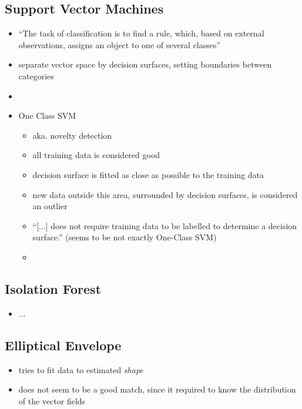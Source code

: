 	\subsection{Support Vector Machines}
	\begin{itemize}
		\item \enquote{The task of classification is to find a rule, which, based on external observations, assigns an object to one of several classes} \parencite{Muller2001}
		\item separate vector space by decision surfaces, setting boundaries between categories \parencite{Muller2001}
		\item 
		
		
		\item One Class SVM
			\begin{itemize}
				\item aka. novelty detection
				\item all training data is considered good
				\item decision surface is fitted as close as possible to the training data
				\item new data outside this area, surrounded by decision surfaces, is considered an outlier
				\item \enquote{[...] does not require training data to be labelled to determine a decision surface.} \parencite{Lazarevic2003} (seems to be not exactly One-Class SVM)
				\item 
			\end{itemize}
	\end{itemize}
	
	\subsection{Isolation Forest}
	\begin{itemize}
		\item ...
	\end{itemize}
	
	\subsection{Elliptical Envelope}
	\begin{itemize}
		\item tries to fit data to estimated \emph{shape}
		\item does not seem to be a good match, since it required to know the distribution of the vector fields
	\end{itemize}

